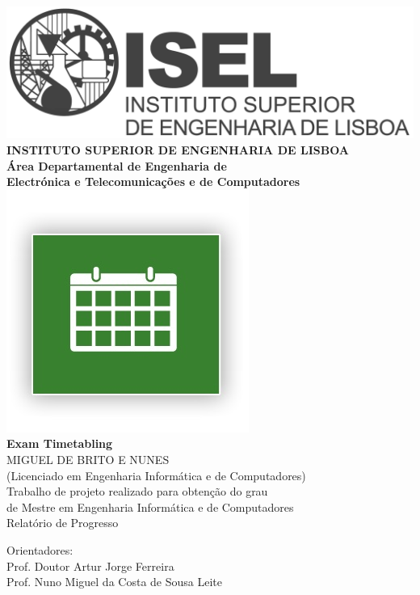 \begin{titlepage}
	\begin{center}
		\includegraphics[width=7 cm]{./images/Logo_ISEL2.png} \\[0.5cm]
		{\Large \textbf{INSTITUTO SUPERIOR DE ENGENHARIA DE LISBOA}} \\[0.5cm]
		{\Large \textbf{Área Departamental de Engenharia de \\Electrónica e Telecomunica\c cões e de Computadores}} \\[0.8cm]		
		\includegraphics[height=3.5 cm]{./images/guide_me_logo.jpg} \\[0.8cm]
		\fontsize{18pt}{10pt}\selectfont
		{\textbf{Exam Timetabling}} \\[0.8cm]
		\fontsize{16pt}{10pt}\selectfont
		MIGUEL DE BRITO E NUNES\\[0.2cm]
		\fontsize{14pt}{10pt}\selectfont
		(Licenciado em Engenharia Informática e de Computadores)\\[0.8cm]
		\fontsize{12pt}{10pt}\selectfont
		{Trabalho de projeto realizado para obten\c cão do grau\\de Mestre em Engenharia Informática e de Computadores} \\[0.8cm]
		\fontsize{16pt}{10pt}\selectfont
		Relatório de Progresso
		\vfill
		\begin{tabbing}
		   \fontsize{12pt}{10pt}\selectfont
		   Orientadores: \\
		   \fontsize{11pt}{10pt}\selectfont
		  	\hspace{1.1cm}Prof. Doutor Artur Jorge Ferreira \\
		   \fontsize{11pt}{10pt}\selectfont
		   \hspace{1.1cm}Prof. Nuno Miguel da Costa de Sousa Leite \\
		\end{tabbing}

\end{center}
\end{titlepage}
